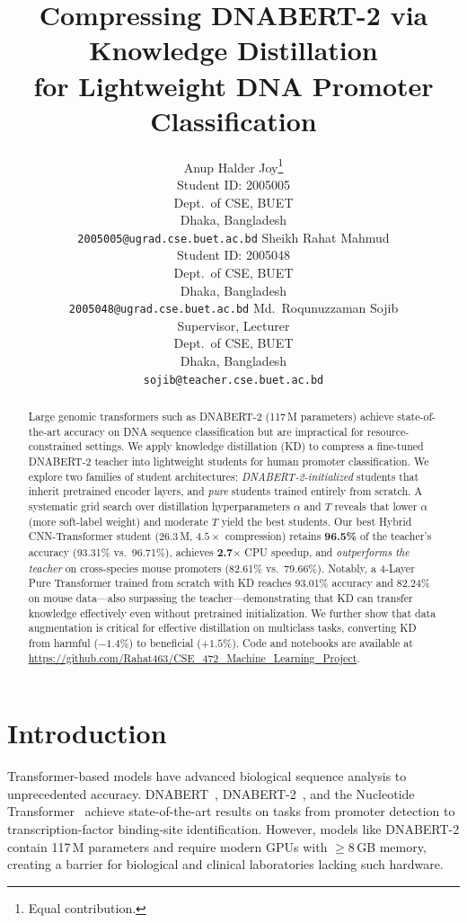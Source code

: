 \documentclass{article}
\title{Compressing DNABERT-2 via Knowledge Distillation\\for Lightweight DNA Promoter Classification}
\author{
Anup Halder Joy\thanks{Equal contribution.} \\
Student ID: 2005005\\
Dept.\ of CSE, BUET\\
Dhaka, Bangladesh\\
\texttt{2005005@ugrad.cse.buet.ac.bd}
\And
Sheikh Rahat Mahmud\footnotemark[1] \\
Student ID: 2005048\\
Dept.\ of CSE, BUET\\
Dhaka, Bangladesh\\
\texttt{2005048@ugrad.cse.buet.ac.bd}
\And
Md.\ Roqunuzzaman Sojib \\
Supervisor, Lecturer\\
Dept.\ of CSE, BUET\\
Dhaka, Bangladesh\\
\texttt{sojib@teacher.cse.buet.ac.bd}
}
\begin{document}
\maketitle

\begin{abstract}
Large genomic transformers such as DNABERT-2 (117\,M parameters) achieve state-of-the-art accuracy on DNA sequence classification but are impractical for resource-constrained settings.
We apply knowledge distillation (KD) to compress a fine-tuned DNABERT-2 teacher into lightweight students for human promoter classification.
We explore two families of student architectures: \emph{DNABERT-2-initialized} students that inherit pretrained encoder layers, and \emph{pure} students trained entirely from scratch.
A systematic grid search over distillation hyperparameters $\alpha$ and $T$ reveals that lower $\alpha$ (more soft-label weight) and moderate $T$ yield the best students.
Our best Hybrid CNN-Transformer student (26.3\,M, $4.5\times$ compression) retains \textbf{96.5\%} of the teacher's accuracy (93.31\% vs.\ 96.71\%), achieves \textbf{2.7$\times$} CPU speedup, and \emph{outperforms the teacher} on cross-species mouse promoters (82.61\% vs.\ 79.66\%).
Notably, a 4-Layer Pure Transformer trained from scratch with KD reaches 93.01\% accuracy and 82.24\% on mouse data---also surpassing the teacher---demonstrating that KD can transfer knowledge effectively even without pretrained initialization.
We further show that data augmentation is critical for effective distillation on multiclass tasks, converting KD from harmful ($-1.4\%$) to beneficial ($+1.5\%$).
Code and notebooks are available at \url{https://github.com/Rahat463/CSE_472_Machine_Learning_Project}.
\end{abstract}

\section{Introduction}
\label{sec:intro}

Transformer-based models have advanced biological sequence analysis to unprecedented accuracy.
DNABERT~\cite{ji2021dnabert}, DNABERT-2~\cite{zhou2023dnabert2}, and the Nucleotide Transformer~\cite{dallatorre2023nucleotide} achieve state-of-the-art results on tasks from promoter detection to transcription-factor binding-site identification.
However, models like DNABERT-2 contain 117\,M parameters and require modern GPUs with $\geq$8\,GB memory, creating a barrier for biological and clinical laboratories lacking such hardware.
\end{document}
